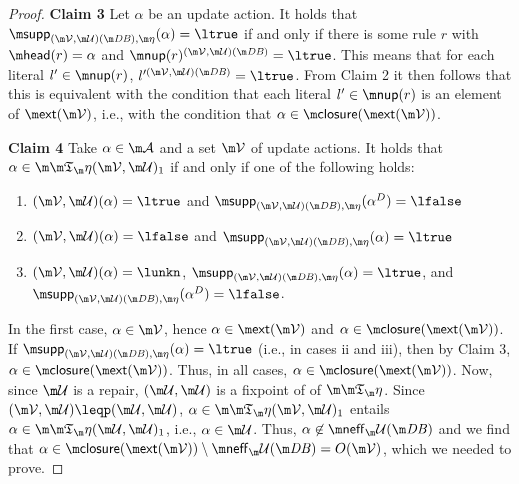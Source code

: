 \begin{proof}
\textbf{Claim 3} 
Let $\alpha$ be an update action. 
It holds that  $\supp_{(\VV,\UU)(\db),\aics}(\alpha) = \ltrue$ if and only if there is some rule $r$ with $\head(r)=\alpha$ and $\nup(r)^{ (\VV, \UU)(\db)} = \ltrue$. This means that for each literal $l'\in \nup(r)$, $l'^{(\VV, \UU)(\db)} = \ltrue$. From Claim 2 it then follows that this is equivalent with the condition that each literal $l'\in\nup(r)$ is an element of   $\ext(\VV)$, i.e., with  the condition that $\alpha \in \closure(\ext(\VV))$. 


\textbf{Claim 4}
Take $\alpha\in\acts$ and a set $\VV$ of update actions. It holds that $ \alpha \in \Ap(\VV,\UU)_1$ if and only if one of the following holds:
\begin{enumerate}
 \item  $( \VV, \UU)(\alpha) = \ltrue$ and $\supp_{(\VV,\UU)(\db),\aics}(\alpha^D)=\lfalse$
 \item $( \VV, \UU)(\alpha) = \lfalse$ and $\supp_{(\VV,\UU)(\db),\aics}(\alpha)=\ltrue$
 \item $( \VV, \UU)(\alpha) = \lunkn$, $ \supp_{(\VV,\UU)(\db),\aics}(\alpha)=\ltrue$, and $\supp_{(\VV,\UU)(\db),\aics}(\alpha^D) = \lfalse$.
\end{enumerate}
In the first case, $\alpha \in \VV$, hence $\alpha\in\ext(\VV)$ and $\alpha \in \closure(\ext(\VV))$. 
If $\supp_{(\VV,\UU)(\db),\aics}(\alpha)=\ltrue$ (i.e., in cases ii and iii), then by Claim 3, $\alpha\in \closure(\ext(\VV))$. Thus, in all cases, $\alpha\in \closure(\ext(\VV))$. 
Now, since $\UU$ is a repair, $(\UU,\UU)$ is a fixpoint of of $\Ap$. Since $(\VV,\UU)\leqp(\UU,\UU)$, $\alpha \in \Ap(\VV,\UU)_1$ entails $\alpha \in \Ap(\UU,\UU)_1$, i.e., $\alpha \in \UU$. 
Thus, $\alpha \not \in \neff_\UU(\db)$ and we find that $\alpha \in \closure(\ext(\VV))\setminus  \neff_\UU(\db) = O(\VV)$,  which we needed to prove. \qedhere





\end{proof}
